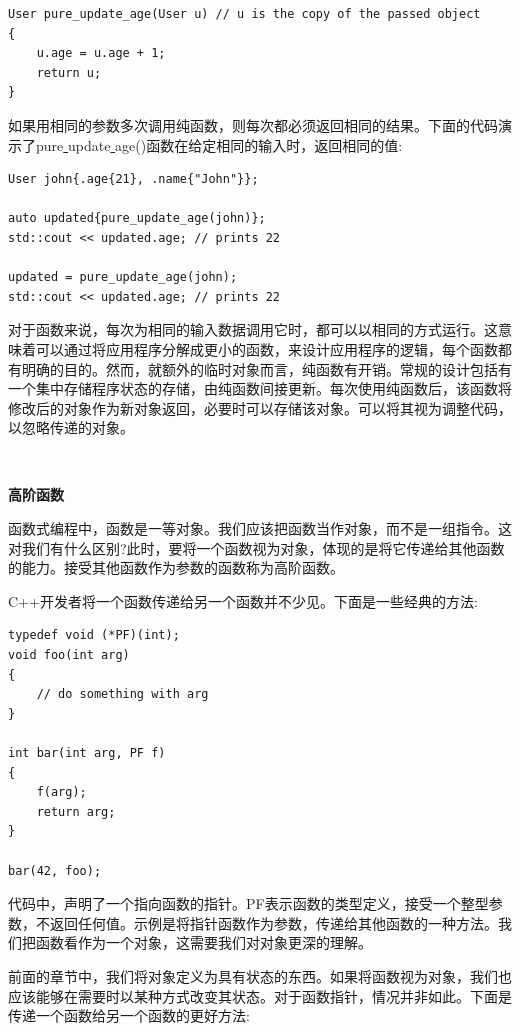\begin{lstlisting}[caption={}]
User pure_update_age(User u) // u is the copy of the passed object
{
	u.age = u.age + 1;
	return u;
}
\end{lstlisting}

如果用相同的参数多次调用纯函数，则每次都必须返回相同的结果。下面的代码演示了pure\underline{ }update\underline{ }age()函数在给定相同的输入时，返回相同的值: \par

\begin{lstlisting}[caption={}]
User john{.age{21}, .name{"John"}};

auto updated{pure_update_age(john)};
std::cout << updated.age; // prints 22

updated = pure_update_age(john);
std::cout << updated.age; // prints 22
\end{lstlisting}

对于函数来说，每次为相同的输入数据调用它时，都可以以相同的方式运行。这意味着可以通过将应用程序分解成更小的函数，来设计应用程序的逻辑，每个函数都有明确的目的。然而，就额外的临时对象而言，纯函数有开销。常规的设计包括有一个集中存储程序状态的存储，由纯函数间接更新。每次使用纯函数后，该函数将修改后的对象作为新对象返回，必要时可以存储该对象。可以将其视为调整代码，以忽略传递的对象。 \par

\noindent\textbf{}\ \par
\textbf{高阶函数} \ \par
函数式编程中，函数是一等对象。我们应该把函数当作对象，而不是一组指令。这对我们有什么区别?此时，要将一个函数视为对象，体现的是将它传递给其他函数的能力。接受其他函数作为参数的函数称为高阶函数。 \par
C++开发者将一个函数传递给另一个函数并不少见。下面是一些经典的方法: \par

\begin{lstlisting}[caption={}]
typedef void (*PF)(int);
void foo(int arg)
{
	// do something with arg
}

int bar(int arg, PF f)
{
	f(arg);
	return arg;
}

bar(42, foo);
\end{lstlisting}

代码中，声明了一个指向函数的指针。PF表示函数的类型定义，接受一个整型参数，不返回任何值。示例是将指针函数作为参数，传递给其他函数的一种方法。我们把函数看作为一个对象，这需要我们对对象更深的理解。 \par
前面的章节中，我们将对象定义为具有状态的东西。如果将函数视为对象，我们也应该能够在需要时以某种方式改变其状态。对于函数指针，情况并非如此。下面是传递一个函数给另一个函数的更好方法: \par

